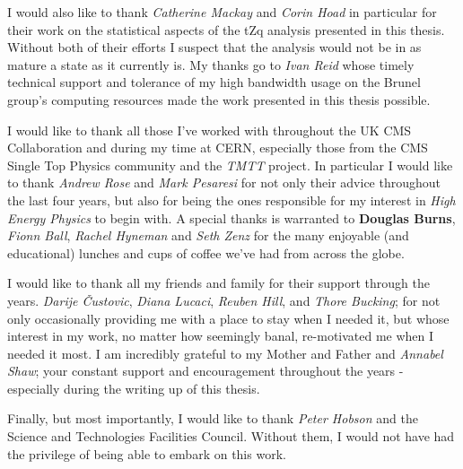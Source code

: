 \documentclass[11pt,a4paper]{report}
\begin{document}
I would also like to thank \textit{Catherine Mackay} and \textit{Corin Hoad} in particular for their work on the statistical aspects of the tZq analysis presented in this thesis.
Without both of their efforts I suspect that the analysis would not be in as mature a state as it currently is.
My thanks go to \textit{Ivan Reid} whose timely technical support and tolerance of my high bandwidth usage on the Brunel group's computing resources made the work presented in this thesis possible.

I would like to thank all those I've worked with throughout the UK CMS Collaboration and during my time at CERN, especially those from the CMS Single Top Physics community and the \emph{TMTT} project.
In particular I would like to thank \textit{Andrew Rose} and \textit{Mark Pesaresi} for not only their advice throughout the last four years, but also for being the ones responsible for my interest in \emph{High Energy Physics} to begin with.
A special thanks is warranted to  \textbf{Douglas Burns}, \emph{Fionn Ball}, \emph{Rachel Hyneman} and \textit{Seth Zenz} for the many enjoyable (and educational) lunches and cups of coffee we've had from across the globe.

I would like to thank all my friends and family for their support through the years.
\textit{Darije \v{C}ustovi{c}}, \textit{Diana Lucaci}, \textit{Reuben Hill}, and \textit{Thore Bucking}; for not only occasionally providing me with a place to stay when I needed it, but whose interest in my work, no matter how seemingly banal, re-motivated me when I needed it most.
I am incredibly grateful to my Mother and Father and \textit{Annabel Shaw}; your constant support and encouragement throughout the years - especially during the writing up of this thesis.

Finally, but most importantly, I would like to thank \textit{Peter Hobson} and the Science and Technologies Facilities Council.
Without them, I would not have had the privilege of being able to embark on this work. 

\tableofcontents
\listoftables
\listoffigures



















\begin{appendices}
%

\end{appendices}



 
\end{document}

